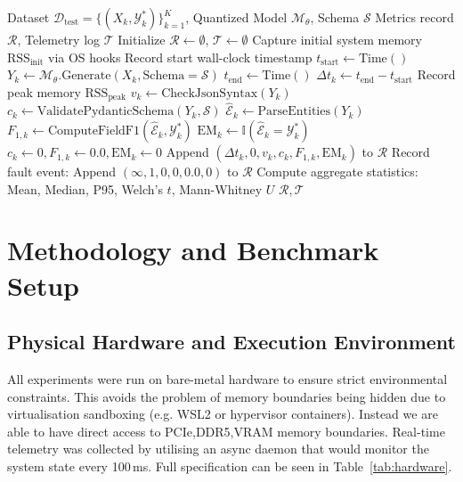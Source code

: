 \documentclass[conference]{IEEEtran}
\begin{document}
{\begin{algorithm}[htbp]
\caption{Edge-Based Schema-Constrained Extraction and Telemetry Pipeline}
\label{alg:pipeline}
\begin{algorithmic}[1]
\REQUIRE Dataset $\mathcal{D}_{\text{test}} = \{(X_k, \mathcal{Y}_k^*)\}_{k=1}^K$, Quantized Model $\mathcal{M}_\theta$, Schema $\mathcal{S}$
\ENSURE Metrics record $\mathcal{R}$, Telemetry log $\mathcal{T}$
\STATE Initialize $\mathcal{R} \leftarrow \emptyset$, $\mathcal{T} \leftarrow \emptyset$
    \STATE Capture initial system memory $\text{RSS}_{\text{init}}$ via OS hooks
    \STATE Record start wall-clock timestamp $t_{\text{start}} \leftarrow \text{Time}()$
    \TRY
        \STATE $Y_k \leftarrow \mathcal{M}_\theta.\text{Generate}(X_k, \text{Schema}=\mathcal{S})$
        \STATE $t_{\text{end}} \leftarrow \text{Time}()$
        \STATE $\Delta t_k \leftarrow t_{\text{end}} - t_{\text{start}}$
        \STATE Record peak memory $\text{RSS}_{\text{peak}}$
        \STATE $v_k \leftarrow \text{CheckJsonSyntax}(Y_k)$ 
            \STATE $c_k \leftarrow \text{ValidatePydanticSchema}(Y_k, \mathcal{S})$
            \STATE $\hat{\mathcal{E}}_k \leftarrow \text{ParseEntities}(Y_k)$
            \STATE $F_{1,k} \leftarrow \text{ComputeFieldF1}(\hat{\mathcal{E}}_k, \mathcal{Y}_k^*)$
            \STATE $\text{EM}_k \leftarrow \mathbb{I}(\hat{\mathcal{E}}_k = \mathcal{Y}_k^*)$
        \ELSE
            \STATE $c_k \leftarrow 0, F_{1,k} \leftarrow 0.0, \text{EM}_k \leftarrow 0$
        \ENDIF
        \STATE Append $(\Delta t_k, 0, v_k, c_k, F_{1,k}, \text{EM}_k)$ to $\mathcal{R}$
        \STATE Record fault event: Append $(\infty, 1, 0, 0, 0.0, 0)$ to $\mathcal{R}$
    \ENDTRY
\ENDFOR
\STATE Compute aggregate statistics: Mean, Median, P95, Welch's $t$, Mann-Whitney $U$
\RETURN $\mathcal{R}, \mathcal{T}$
\end{algorithmic}
\end{algorithm}

\section{Methodology and Benchmark Setup}
\label{sec:methodology}

\subsection{Physical Hardware and Execution Environment}
All experiments were run on bare-metal hardware to ensure strict environmental constraints. This avoids the problem of memory boundaries being hidden due to virtualisation sandboxing (e.g. WSL2 or hypervisor containers). Instead we are able to have direct access to PCIe,DDR5,VRAM memory boundaries. Real-time telemetry was collected by utilising an async daemon that would monitor the system state every 100\,ms. Full specification can be seen in Table~\ref{tab:hardware}.

}
\end{document}
